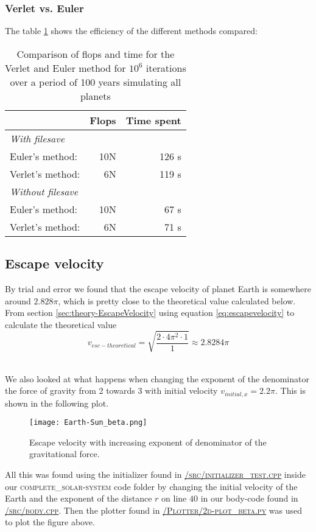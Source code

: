 \documentclass[../main.tex]{subfiles}
\begin{document}
\subsubsection{Verlet vs. Euler}\label{sec:Verlet_VS_Euler}
The table \ref{tab:EulervsVerlet} shows the efficiency of the different methods compared:
\begin{table}[!h]
  \centering
  \begin{tabular}{l r r}
                            &\textbf{Flops}&\textbf{Time spent}\\
                            \hline
    \textit{With filesave} & & \\
    Euler's method:          &  10N & 126 s\\
    Verlet's method:          & 6N  & 119 s\\
    \hline
    \textit{Without filesave} & & \\
    Euler's method:          &  10N & 67 s\\
    Verlet's method:          & 6N  & 71 s\\
  \end{tabular}
  \caption{Comparison of flops and time for the Verlet and Euler method for $10^6$ iterations over a period of 100 years simulating all planets}
  \label{tab:EulervsVerlet}
  \end{table}
\FloatBarrier

\subsection{Escape velocity} \label{sec:results-esc-vel}
By trial and error we found that the escape velocity of planet Earth is somewhere around $2.828 \pi$, which is pretty close to the theoretical value calculated below.
From section \ref{sec:theory-EscapeVelocity} using equation \eqref{eq:escapevelocity} to calculate the  theoretical value $$v_{esc-theoretical} = \sqrt{\frac{2\cdot4\pi^2\cdot1}{1}} \approx 2.8284 \pi$$\

We also looked at what happens when changing the exponent of the denominator the force of gravity from 2 towards 3 with initial velocity $v_{initial,x} = 2.2\pi$. This is shown in the following plot.

\begin{figure}[h!]
  \centering
  \texttt{[image: Earth-Sun\_beta.png]}
  \caption{Escape velocity with increasing exponent of denominator of the gravitational force.}
  \label{fig:v_esc_beta}
\end{figure}
\FloatBarrier
All this was found using the initializer found in \href{https://github.com/kmaasrud/Project-5/blob/master/code/complete_solar-system/src/initialize_test.cpp}{\textsc{/src/initializer\_test.cpp}} inside our \textsc{complete\_solar-system} code folder by changing the initial velocity of the Earth and the exponent of the distance $r$ on line $40$ in our body-code found in \href{https://github.com/kmaasrud/Project-5/blob/master/code/complete_solar-system/src/body.cpp}{\textsc{/src/body.cpp}}. Then the plotter found in \href{https://github.com/kmaasrud/Project-5/blob/master/code/Plotter/2d-plot_beta.py}{\textsc{/Plotter/2d-plot\_beta.py}} was used to plot the figure above.
\end{document}
